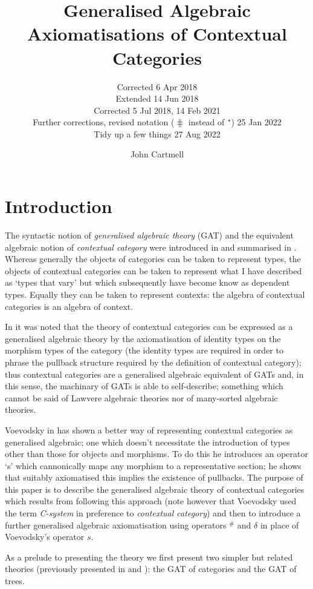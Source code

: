 \documentclass[10pt,a4paper]{scrartcl}
\title{Generalised Algebraic Axiomatisations of Contextual Categories}
\subtitle{Corrected 6 Apr 2018 \\
          Extended 14 Jun 2018 \\
		  Corrected 5 Jul 2018, 14 Feb 2021 \\
          Further corrections, revised notation ($\hash$ instead of $^*\kern-1pt$) 25 Jan 2022 \\
          Tidy up a few things 27 Aug 2022}
\author{John Cartmell}
\date{}
\newcommand{\hash}{^\#}
\begin{document}
\maketitle


\section{Introduction}
The syntactic notion of \textit{generalised algebraic theory} (GAT) and the  equivalent algebraic notion of \textit{contextual category} were introduced in  \cite{Cartmell78} and summarised in \cite{Cartmell86}. Whereas generally the objects of categories can be taken to represent types, the objects of contextual categories can be taken to represent what I have described as `types that vary' but which subsequently have become know as dependent types. Equally they can be taken to represent contexts: the algebra of contextual categories is an algebra of context. 

In \cite{Cartmell78} it was noted that the theory of contextual categories can be expressed as a generalised algebraic theory by the axiomatisation of identity types on the morphism types of the category 
(the identity types are required in order to phrase the pullback structure required by the definition of contextual category); thus contextual categories are a generalised algebraic equivalent of GATs and, in this sense, the machinary of GATs is able to self-describe; something which cannot be said of Lawvere algebraic theories nor of many-sorted algebraic theories.  

 Voevodsky in \cite{Voevodsky14C} has shown a better way of representing contextual categories as generalised algebraic; one which doesn't necessitate the introduction of types other than those for objects and morphisms. To do this he introduces an operator `s' which cannonically maps any morphism to a representative section; he shows that suitably axiomatised this implies the existence of pullbacks.  The purpose of this paper is to describe the generalised algebraic theory
of contextual categories which results from following this approach (note however that Voevodsky used the term \textit{C-system} in preference to \textit{contextual category}) and then to introduce a further generalised algebraic axiomatisation using operators $\hash$ and $\delta$ in place of Voevodsky's operator $s$.   

As a prelude to presenting the theory we first present two simpler but related theories (previously presented in \cite{Cartmell78} and \cite{Cartmell86}): the GAT of categories and the GAT of trees.
\end{document}
